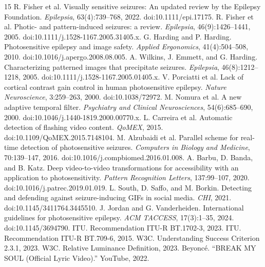 \documentclass[9pt,twocolumn]{article}
\begin{document}
\begin{thebibliography}{15}\small
{} R. Fisher et al. Visually sensitive seizures: An updated review by the Epilepsy Foundation. \emph{Epilepsia}, 63(4):739--768, 2022. doi:10.1111/epi.17175.
 R. Fisher et al. Photic- and pattern-induced seizures: a review. \emph{Epilepsia}, 46(9):1426--1441, 2005. doi:10.1111/j.1528-1167.2005.31405.x.
 G. Harding and P. Harding. Photosensitive epilepsy and image safety. \emph{Applied Ergonomics}, 41(4):504--508, 2010. doi:10.1016/j.apergo.2008.08.005.
 A. Wilkins, J. Emmett, and G. Harding. Characterizing patterned images that precipitate seizures. \emph{Epilepsia}, 46(8):1212--1218, 2005. doi:10.1111/j.1528-1167.2005.01405.x.
 V. Porciatti et al. Lack of cortical contrast gain control in human photosensitive epilepsy. \emph{Nature Neuroscience}, 3:259--263, 2000. doi:10.1038/72972.
 M. Nomura et al. A new adaptive temporal filter. \emph{Psychiatry and Clinical Neurosciences}, 54(6):685--690, 2000. doi:10.1046/j.1440-1819.2000.00770.x.
 L. Carreira et al. Automatic detection of flashing video content. \emph{QoMEX}, 2015. doi:10.1109/QoMEX.2015.7148104.
 M. Alzubaidi et al. Parallel scheme for real-time detection of photosensitive seizures. \emph{Computers in Biology and Medicine}, 70:139--147, 2016. doi:10.1016/j.compbiomed.2016.01.008.
 A. Barbu, D. Banda, and B. Katz. Deep video-to-video transformations for accessibility with an application to photosensitivity. \emph{Pattern Recognition Letters}, 137:99--107, 2020. doi:10.1016/j.patrec.2019.01.019.
 L. South, D. Saffo, and M. Borkin. Detecting and defending against seizure-inducing GIFs in social media. \emph{CHI}, 2021. doi:10.1145/3411764.3445510.
 J. Jordan and G. Vanderheiden. International guidelines for photosensitive epilepsy. \emph{ACM TACCESS}, 17(3):1--35, 2024. doi:10.1145/3694790.
 ITU. Recommendation ITU-R BT.1702-3, 2023.
 ITU. Recommendation ITU-R BT.709-6, 2015.
 W3C. Understanding Success Criterion 2.3.1, 2023.
 W3C. Relative Luminance Definition, 2023.
 Beyonc\'e. ``BREAK MY SOUL (Official Lyric Video).'' YouTube, 2022.
\end{thebibliography}
\end{document}
